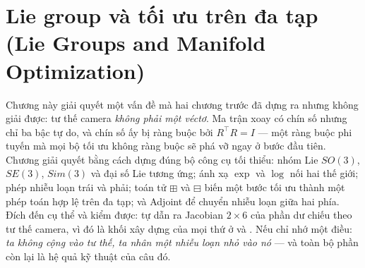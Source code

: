 \documentclass[../../vslam.tex]{subfiles}
\begin{document}
\chapter{Lie group và tối ưu trên đa tạp (Lie Groups and Manifold Optimization)}

\begin{tomtat}
Chương này giải quyết một vấn đề mà hai chương trước đã dựng ra nhưng không giải được: tư thế camera \emph{không phải một véctơ}. Ma trận xoay có chín số nhưng chỉ ba bậc tự do, và chín số ấy bị ràng buộc bởi \(R^{\top}R = I\) --- một ràng buộc phi tuyến mà mọi bộ tối ưu không ràng buộc sẽ phá vỡ ngay ở bước đầu tiên. Chương giải quyết bằng cách dựng đúng bộ công cụ tối thiểu: nhóm Lie \(SO(3)\), \(SE(3)\), \(Sim(3)\) và đại số Lie tương ứng; ánh xạ \(\exp\) và \(\log\) nối hai thế giới; phép nhiễu loạn trái và phải; toán tử \(\boxplus\) và \(\boxminus\) biến một bước tối ưu thành một phép toán hợp lệ trên đa tạp; và Adjoint để chuyển nhiễu loạn giữa hai phía. Đích đến cụ thể và kiểm được: tự dẫn ra Jacobian \(2\times 6\) của phần dư chiếu theo tư thế camera, vì đó là khối xây dựng của mọi thứ ở  và . Nếu chỉ nhớ một điều: \emph{ta không cộng vào tư thế, ta nhân một nhiễu loạn nhỏ vào nó} --- và toàn bộ phần còn lại là hệ quả kỹ thuật của câu đó.
\end{tomtat}
\end{document}
